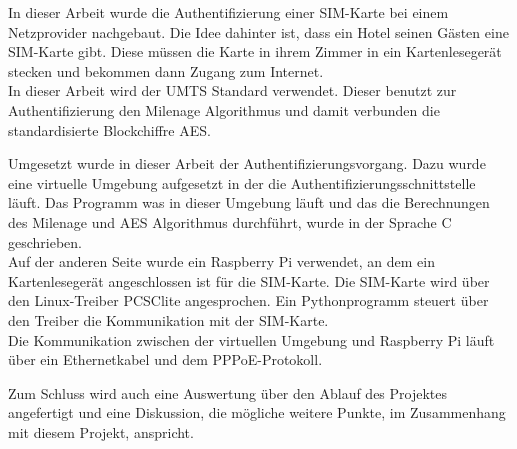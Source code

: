 In dieser Arbeit wurde die Authentifizierung einer SIM-Karte
bei einem Netzprovider nachgebaut. Die Idee dahinter ist, dass
ein Hotel seinen Gästen eine SIM-Karte gibt. Diese müssen die
Karte in ihrem Zimmer in ein Kartenlesegerät stecken und bekommen
dann Zugang zum Internet. \\
In dieser Arbeit wird der UMTS Standard verwendet. Dieser benutzt
zur Authentifizierung den Milenage Algorithmus und damit verbunden
die standardisierte Blockchiffre AES.

Umgesetzt wurde in dieser Arbeit der Authentifizierungsvorgang. Dazu
wurde eine virtuelle Umgebung aufgesetzt in der die Authentifizierungsschnittstelle
läuft. Das Programm was in dieser Umgebung läuft und das die Berechnungen
des Milenage und AES Algorithmus durchführt, wurde in der Sprache C
geschrieben. \\
Auf der anderen Seite wurde ein Raspberry Pi verwendet, an dem ein Kartenlesegerät
angeschlossen ist für die SIM-Karte. Die SIM-Karte wird über den Linux-Treiber
PCSClite angesprochen. Ein Pythonprogramm steuert über den Treiber die Kommunikation
mit der SIM-Karte. \\
Die Kommunikation zwischen der virtuellen Umgebung und Raspberry Pi läuft über
ein Ethernetkabel und dem PPPoE-Protokoll.

Zum Schluss wird auch eine Auswertung über den Ablauf des Projektes angefertigt und
eine Diskussion, die mögliche weitere Punkte, im Zusammenhang mit diesem Projekt,
anspricht.